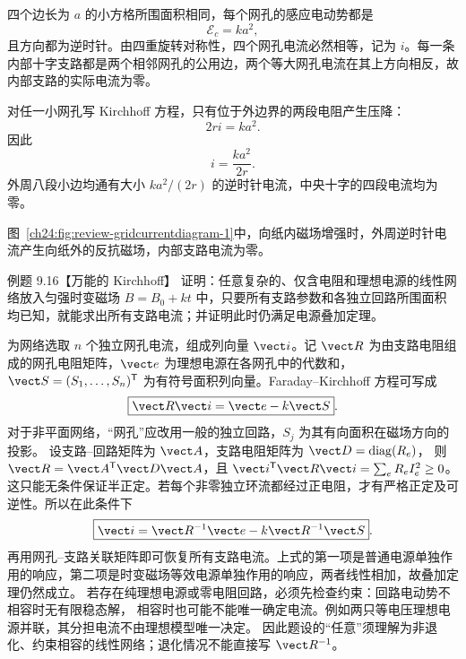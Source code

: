 \begin{xesolution}
四个边长为 $a$ 的小方格所围面积相同，每个网孔的感应电动势都是
\begin{equation}
  \mathcal E_c=ka^2,
\end{equation}
且方向都为逆时针。由四重旋转对称性，四个网孔电流必然相等，记为 $i$。每一条内部十字支路都是两个相邻网孔的公用边，两个等大网孔电流在其上方向相反，故内部支路的实际电流为零。

对任一小网孔写 Kirchhoff 方程，只有位于外边界的两段电阻产生压降：
\begin{equation}
  2ri=ka^2.
\end{equation}
因此
\begin{equation}
  \boxed{i=\frac{ka^2}{2r}}.
\end{equation}
外周八段小边均通有大小 $ka^2/(2r)$ 的逆时针电流，中央十字的四段电流均为零。

图~\ref{ch24:fig:review-gridcurrentdiagram-1}中，向纸内磁场增强时，外周逆时针电流产生向纸外的反抗磁场，内部支路电流为零。
\par\noindent\begin{minipage}{\linewidth}
\gridCurrentDiagram
{}\label{ch24:fig:review-gridcurrentdiagram-1}
\end{minipage}\par\medskip
\end{xesolution}

\begin{origexamplebox}{例题 9.16【万能的 Kirchhoff】}
证明：任意复杂的、仅含电阻和理想电源的线性网络放入匀强时变磁场 $B=B_0+kt$ 中，只要所有支路参数和各独立回路所围面积均已知，就能求出所有支路电流；并证明此时仍满足电源叠加定理。
\end{origexamplebox}

\begin{xesolution}
为网络选取 $n$ 个独立网孔电流，组成列向量 $\vect i$。记 $\vect R$ 为由支路电阻组成的网孔电阻矩阵，$\vect e$ 为理想电源在各网孔中的代数和，
$\vect S=(S_1,\ldots,S_n)^{\mathsf T}$ 为有符号面积列向量。Faraday--Kirchhoff 方程可写成
\begin{equation}
  \boxed{\vect R\vect i=\vect e-k\vect S}.
\end{equation}
对于非平面网络，“网孔”应改用一般的独立回路，$S_j$ 为其有向面积在磁场方向的投影。
设支路--回路矩阵为 $\vect A$，支路电阻矩阵为 $\vect D=\operatorname{diag}(R_e)$，
则 $\vect R=\vect A^{\mathsf T}\vect D\vect A$，且
$\vect i^{\mathsf T}\vect R\vect i=\sum_eR_eI_e^2\ge0$。
这只能无条件保证半正定。若每个非零独立环流都经过正电阻，才有严格正定及可逆性。所以在此条件下
\begin{equation}
  \boxed{\vect i=\vect R^{-1}\vect e-k\vect R^{-1}\vect S}.
\end{equation}
再用网孔--支路关联矩阵即可恢复所有支路电流。上式的第一项是普通电源单独作用的响应，第二项是时变磁场等效电源单独作用的响应，两者线性相加，故叠加定理仍然成立。
若存在纯理想电源或零电阻回路，必须先检查约束：回路电动势不相容时无有限稳态解，
相容时也可能不能唯一确定电流。例如两只等电压理想电源并联，其分担电流不由理想模型唯一决定。
因此题设的“任意”须理解为非退化、约束相容的线性网络；退化情况不能直接写 $\vect R^{-1}$。
\end{xesolution}

